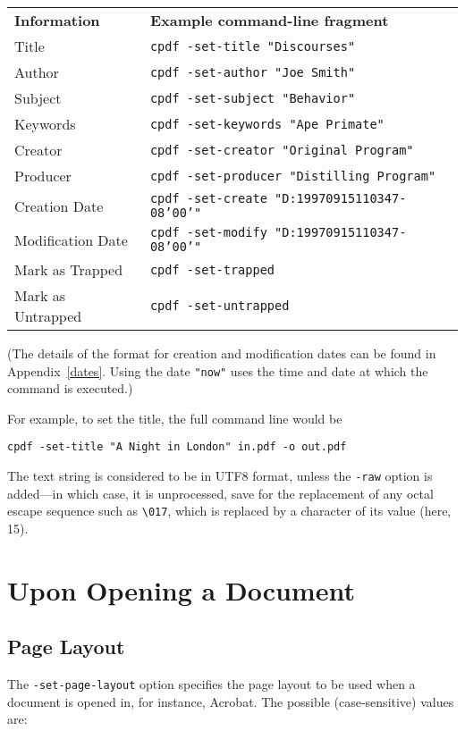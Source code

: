 \documentclass{book}
\begin{document}
{\small\begin{framed}
    \noindent\begin{tabular}{ll}
       \textbf{Information} & \textbf{Example command-line fragment} \\
       Title & \texttt{cpdf -set-title "Discourses"} \\
       Author & \texttt{cpdf -set-author "Joe Smith"} \\
       Subject & \texttt{cpdf -set-subject "Behavior"} \\
       Keywords & \texttt{cpdf -set-keywords "Ape Primate"} \\
       Creator & \texttt{cpdf -set-creator "Original Program"} \\
       Producer & \texttt{cpdf -set-producer "Distilling Program"} \\
       Creation Date & \texttt{cpdf -set-create "D:19970915110347-08'00'"} \\
       Modification Date & \texttt{cpdf -set-modify "D:19970915110347-08'00'"} \\
       Mark as Trapped & \texttt{cpdf -set-trapped} \\
       Mark as Untrapped & \texttt{cpdf -set-untrapped} \\
    \end{tabular}
\end{framed}}

  \noindent (The details of the format for creation and modification dates can be found
in Appendix~\ref{dates}. Using the date \texttt{"now"} uses the time and date
at which the command is executed.)
  
  \vspace{2mm}
  For example, to set the title, the full command line would be
  \begin{framed}
    \small\verb!cpdf -set-title "A Night in London" in.pdf -o out.pdf!
  \end{framed}
\noindent The text string is considered to be in UTF8 format, unless the \texttt{-raw}
option is added---in which case, it is unprocessed, save for the replacement of any octal escape sequence such as \texttt{\textbackslash 017}, which is replaced by a character of its value (here, 15).

\section{Upon Opening a Document}

  \subsection{Page Layout}
  The \texttt{-set-page-layout} option specifies the page layout to be used
when a document is opened in, for instance, Acrobat. The possible
(case-sensitive) values are:
\end{document}
